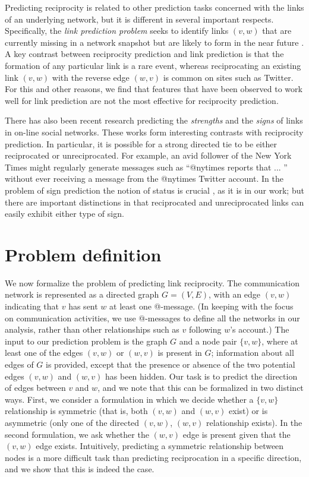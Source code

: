 \documentclass[conference]{IEEEtran}
\begin{document}
Predicting reciprocity is related to other prediction tasks
concerned with the links of an underlying network, but it 
is different in several important respects.
Specifically, the {\em link prediction problem} seeks to identify
links $(v,w)$ that are currently missing in a network snapshot
but are likely to form in the near future
\cite{liben-nowell-link-pred}.
A key contrast between reciprocity prediction and link prediction
is that the formation of any particular link is a rare event,
whereas reciprocating an existing link $(v,w)$ with
the reverse edge $(w,v)$ is common on sites such as Twitter.
For this and other reasons, we find that features 
that have been observed to work well for link 
prediction are not the most effective for reciprocity prediction.

There has also been recent research predicting the 
{\em strengths} \cite{gilbert-tie-strength} and the 
{\em signs} \cite{leskovec-chi10} of links in on-line social networks.
These works form interesting contrasts with reciprocity prediction.
In particular, it is possible for a strong directed tie to be
either reciprocated or unreciprocated.  For example, an avid
follower of the New York Times might regularly generate messages
such as ``@nytimes reports that ... '' without
ever receiving a message from the @nytimes Twitter account.
In the problem of sign prediction the
notion of status is crucial \cite{leskovec-chi10}, as it is in our work;
but there are important distinctions in that reciprocated and
unreciprocated links can easily exhibit either type of sign.

\section{Problem definition}

We now formalize the problem of predicting link reciprocity.
The communication network is represented as a directed graph $G = (V,E)$,
with an edge $(v,w)$ indicating that $v$ has sent $w$ at least one 
@-message.  (In keeping with the focus on communication activities,
we use @-messages to define all the networks in our analysis,
rather than other relationships such as $v$ following $w$'s account.)
The input to our prediction problem is the graph $G$ and a 
node pair $\{v,w\}$, where at least one of the edges $(v,w)$ or
$(w,v)$ is present in $G$; information about all edges of $G$ is provided,
except that the presence or absence of the two potential edges
$(v,w)$ and $(w,v)$ has been hidden.
Our task is to predict the direction of
edges between $v$ and $w$, and we note that this can be formalized in
two distinct ways.  First, we consider a formulation in which we
decide whether a $\{v,w\}$ relationship is symmetric (that is, both
$(v,w)$ and $(w,v)$ exist) or is asymmetric (only one of the directed
$(v,w)$, $(w,v)$ relationship exists).  
In the second formulation, we ask whether the $(w,v)$ edge is
present given that the $(v,w)$ edge exists.  Intuitively, predicting a
symmetric relationship between nodes is a more difficult task than
predicting reciprocation in a specific direction, and we show that
this is indeed the case.
\end{document}
